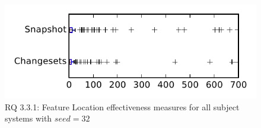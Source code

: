 
\begin{figure}
\centering
\includegraphics[height=0.4\textheight]{figures/flt_seed/rq1_tiny_32}
\caption{RQ 3.3.1: Feature Location effectiveness measures for all subject systems with $seed=32$}
\label{fig:flt_seed:rq1:tiny}
\end{figure}
